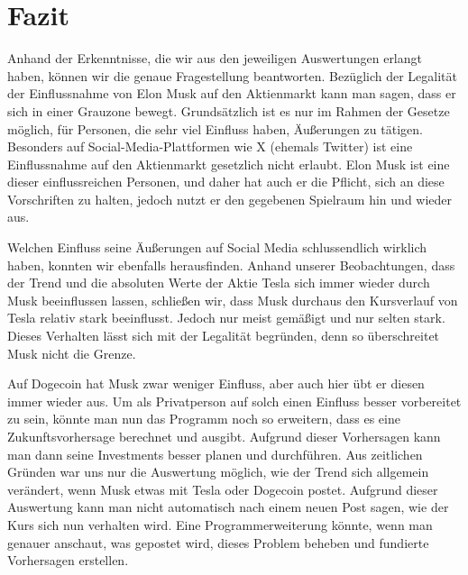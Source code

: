 \documentclass{article}
\begin{document}
\section{Fazit}
Anhand der Erkenntnisse, die wir aus den jeweiligen Auswertungen erlangt haben, können wir die genaue Fragestellung beantworten. Bezüglich der Legalität der Einflussnahme von Elon Musk auf den Aktienmarkt kann man sagen, dass er sich in einer Grauzone bewegt. Grundsätzlich ist es nur im Rahmen der Gesetze möglich, für Personen, die sehr viel Einfluss haben, Äußerungen zu tätigen. Besonders auf Social-Media-Plattformen wie X (ehemals Twitter) ist eine Einflussnahme auf den Aktienmarkt gesetzlich nicht erlaubt. Elon Musk ist eine dieser einflussreichen Personen, und daher hat auch er die Pflicht, sich an diese Vorschriften zu halten, jedoch nutzt er den gegebenen Spielraum hin und wieder aus.

Welchen Einfluss seine Äußerungen auf Social Media schlussendlich wirklich haben, konnten wir ebenfalls herausfinden. Anhand unserer Beobachtungen, dass der Trend und die absoluten Werte der Aktie Tesla sich immer wieder durch Musk beeinflussen lassen, schließen wir, dass Musk durchaus den Kursverlauf von Tesla relativ stark beeinflusst. Jedoch nur meist gemäßigt und nur selten stark. Dieses Verhalten lässt sich mit der Legalität begründen, denn so überschreitet Musk nicht die Grenze.

Auf Dogecoin hat Musk zwar weniger Einfluss, aber auch hier übt er diesen immer wieder aus. Um als Privatperson auf solch einen Einfluss besser vorbereitet zu sein, könnte man nun das Programm noch so erweitern, dass es eine Zukunftsvorhersage berechnet und ausgibt. Aufgrund dieser Vorhersagen kann man dann seine Investments besser planen und durchführen. Aus zeitlichen Gründen war uns nur die Auswertung möglich, wie der Trend sich allgemein verändert, wenn Musk etwas mit Tesla oder Dogecoin postet. Aufgrund dieser Auswertung kann man nicht automatisch nach einem neuen Post sagen, wie der Kurs sich nun verhalten wird. Eine Programmerweiterung könnte, wenn man genauer anschaut, was gepostet wird, dieses Problem beheben und fundierte Vorhersagen erstellen.
\end{document}
